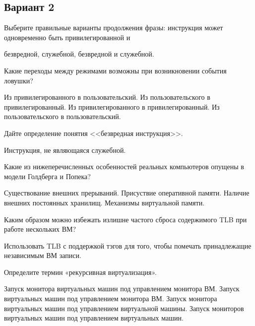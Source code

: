 \subsection*{Вариант 2}

\begin{questions}

\question[3] Выберите правильные варианты продолжения фразы: инструкция может одновременно быть привилегированной и
\begin{choices}
\choice безвредной,
\correctchoice служебной,
\choice безвредной и служебной.
\end{choices}

\question[3] Какие переходы между режимами возможны при возникновении события ловушки?
\begin{choices}
\choice        Из привилегированного в пользовательский.
\correctchoice Из пользовательского в привилегированный.
\correctchoice Из привилегированного в привилегированный.
\choice        Из пользовательского в пользовательский.
\end{choices}

\question[3] Дайте определение понятия <<безвредная инструкция>>.
\begin{solution}[1cm]
Инструкция, не являющаяся служебной.
\end{solution}

\question[3] Какие из нижеперечисленных особенностей реальных компьютеров опущены в модели Голдберга и Попека?
\begin{choices}
    \correctchoice Существование внешних прерываний.
    \choice Присуствие оперативной памяти.
    \correctchoice Наличие внешних постоянных хранилищ.
    \choice Механизмы виртуальной памяти.
\end{choices}

\question[3] Каким образом можно избежать излишне частого сброса содержимого TLB при работе нескольких ВМ?
\begin{solution}[1cm]
Использовать TLB с поддержкой тэгов для того, чтобы помечать принадлежащие независимым ВМ записи.
\end{solution}

\question[3] Определите термин «рекурсивная виртуализация».
\begin{choices}
    \correctchoice Запуск монитора виртуальных машин под управлением монитора ВМ.
    \choice Запуск виртуальных машин под управлением монитора ВМ.
    \choice Запуск монитора виртуальных машин под управлением виртуальной машины.
    \choice Запуск мониторов виртуальных машин под управлением виртуальных машин.
\end{choices}


\end{questions}
